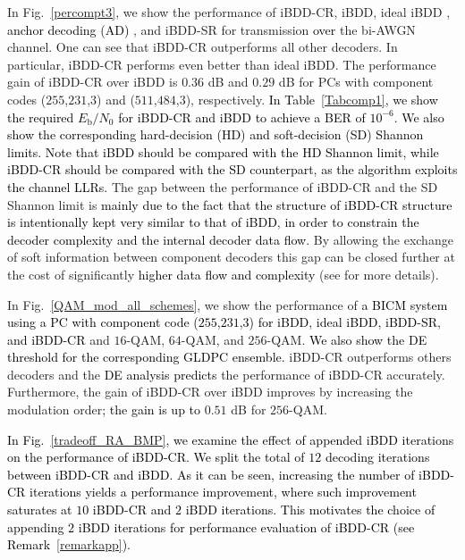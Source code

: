 \documentclass[journal]{IEEEtran}
\newcommand{\SH}{\textcolor{black}}
\newcommand{\AG}{\textcolor{black}}
\begin{document}
In Fig.~\ref{percompt3}, we show the performance of iBDD-CR, iBDD, ideal iBDD%
, \AG{anchor decoding (AD) \cite{Hag18}}, and iBDD-SR for transmission \SH{over} the bi-AWGN channel. 
One can see that iBDD-CR outperforms all other decoders. In particular, iBDD-CR performs even better than ideal iBDD. The performance gain of iBDD-CR over iBDD is $0.36$ dB and $0.29$ dB for PCs with component codes ($255$,$231$,$3$) and ($511$,$484$,$3$), respectively. \SH{In Table~\ref{Tabcomp1}, we show the required $E_\mathrm{b}/N_0$ for iBDD-CR and iBDD to achieve a BER of $10^{-6}$. We also show the corresponding hard-decision (HD) and soft-decision (SD) Shannon limits. Note that iBDD should be compared with the HD Shannon limit, while iBDD-CR should be compared with the SD counterpart, as the algorithm exploits the channel  LLRs.} The gap between the performance of iBDD-CR and the SD Shannon limit is \AG{mainly due to the fact that the structure of \SH{iBDD-CR} structure is intentionally kept very similar to that of iBDD}, \SH{in order to constrain the decoder complexity and \AG{the internal decoder data flow}.} By allowing the exchange of soft information between component decoders this gap can be closed further at the cost of significantly \AG{higher data flow and  complexity} (see \cite{She18b,She19,YibitTCOM} for more details). 

In Fig.~\ref{QAM_mod_all_schemes}, we show the performance of \AG{a  BICM system  using a PC with component  code ($255$,$231$,$3$) for  iBDD, ideal iBDD, iBDD-SR, and iBDD-CR} and $16$-QAM, $64$-QAM, and $256$-QAM. \SH{We also show the DE threshold for the corresponding GLDPC ensemble.} iBDD-CR outperforms others decoders and the \SH{DE analysis predicts} the performance of iBDD-CR accurately. Furthermore, the gain of iBDD-CR over iBDD improves by increasing the modulation order\AG{; the gain \SH{is} up to} $0.51$ dB for $256$-QAM. 
 

\SH{In Fig.~\ref{tradeoff_RA_BMP}, we examine the effect of appended iBDD iterations on the performance of iBDD-CR. We split the total of $12$ decoding iterations between iBDD-CR and iBDD. As it can be seen, increasing the number of iBDD-CR iterations yields a performance improvement, where such improvement saturates at $10$ iBDD-CR and $2$ iBDD iterations. This motivates the choice of appending $2$ iBDD iterations for performance evaluation of iBDD-CR (see Remark~\ref{remarkapp}).} %
 
\end{document}
